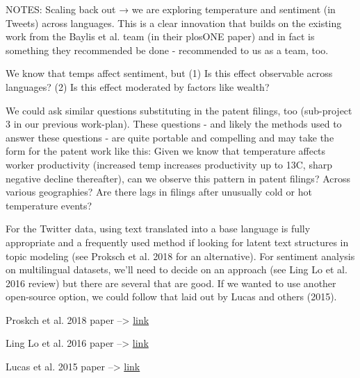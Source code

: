 \documentclass{article}
\begin{document}
NOTES: Scaling back out → we are exploring temperature and sentiment (in Tweets) across languages. This is a clear innovation that builds on the existing work from the Baylis et al. team (in their plosONE paper) and in fact is something they recommended be done - recommended to us as a team, too.

We know that temps affect sentiment, but (1) Is this effect observable across languages? (2) Is this effect moderated by factors like wealth?

We could ask similar questions substituting in the patent filings, too (sub-project 3 in our previous work-plan). These questions - and likely the methods used to answer these questions - are quite portable and compelling and may take the form for the patent work like this: Given we know that temperature affects worker productivity (increased temp increases productivity up to 13C, sharp negative decline thereafter), can we observe this pattern in patent filings? Across various geographies? Are there lags in filings after unusually cold or hot temperature events?

For the Twitter data, using text translated into a base language is fully appropriate and a frequently used method if looking for latent text structures in topic modeling (see Proksch et al. 2018 for an alternative). For sentiment analysis on multilingual datasets, we'll need to decide on an approach (see Ling Lo et al. 2016 review) but there are several that are good. If we wanted to use another open-source option, we could follow that laid out by Lucas and others (2015).

Proskch et al. 2018 paper --> \href{https://onlinelibrary.wiley.com/doi/full/10.1111/lsq.12218}{link} 

Ling Lo et al. 2016 paper --> \href{https://link.springer.com/article/10.1007/s10462-016-9508-4}{link} 

Lucas et al. 2015 paper --> \href{https://www.cambridge.org/core/journals/political-analysis/article/computerassisted-text-analysis-for-comparative-politics/CC8B2CF63A8CC36FE00A13F9839F92BB}{link}
 
\end{document}
